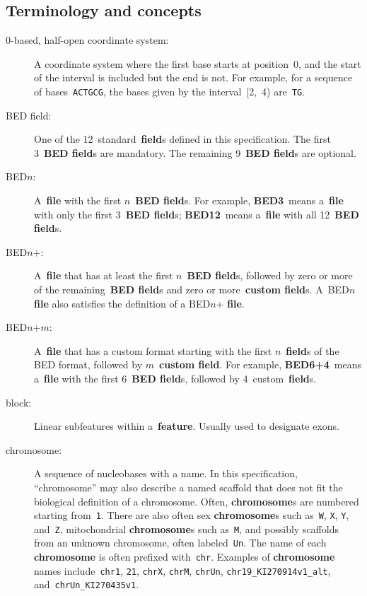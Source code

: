 \documentclass[11pt]{article}
\begin{document}
\subsection{Terminology and concepts}\label{sec:terms}
\begin{description}
\item[0-based, half-open coordinate system:]
  A coordinate system where the first base starts at position~0, and the start of the interval is included but the end is not.
  For example, for a sequence of bases~\texttt{ACTGCG}, the bases given by the interval~[2,~4) are~\texttt{TG}. %

\item[\acs{BED} field:]
  One of the 12~standard~\textbf{field}s defined in this specification.
  The first 3~\textbf{\acs{BED} field}s are mandatory.
  The remaining 9~\textbf{\acs{BED} field}s are optional.

\item[\acs{BED}$n$:]
  A~\textbf{file} with the first $n$~\textbf{\acs{BED} field}s.
  For example, \textbf{BED3}~means a~\textbf{file} with only the first 3~\textbf{\acs{BED} field}s; \textbf{BED12}~means a~\textbf{file} with all 12~\textbf{\acs{BED} field}s.

\item[\acs{BED}$n$+:]
  A~\textbf{file} that has at least the first $n$~\textbf{\acs{BED} field}s, followed by zero or more of the remaining~\textbf{\acs{BED} field}s and zero or more~\textbf{custom field}s.
  A~\acs{BED}$n$ \textbf{file} also satisfies the definition of a \acs{BED}$n$+ \textbf{file}.

\item[\acs{BED}$n$+$m$:]
  A~\textbf{file} that has a custom format starting with the first $n$~\textbf{field}s of the \ac{BED} format, followed by $m$~\textbf{custom field}.
  For example, \textbf{BED6+4}~means a~\textbf{file} with the first 6~\textbf{\acs{BED} field}s, followed by 4~custom~\textbf{field}s.

\item[block:]
  Linear subfeatures within a~\textbf{feature}.
  Usually used to designate exons.

\item[chromosome:]
  A sequence of nucleobases with a name.
  In this specification, ``chromosome'' may also describe a named scaffold that does not fit the biological definition of a chromosome.
  Often, \textbf{chromosome}s are numbered starting from~\texttt{1}.
  There are also often sex \textbf{chromosome}s such as~\texttt{W}, \texttt{X}, \texttt{Y}, and~\texttt{Z}, mitochondrial \textbf{chromosome}s such as~\texttt{M}, and possibly scaffolds from an unknown chromosome, often labeled~\texttt{Un}.
  The name of each \textbf{chromosome} is often prefixed with~\texttt{chr}.
  Examples of \textbf{chromosome} names include~\texttt{chr1}, \texttt{21}, \texttt{chrX}, \texttt{chrM}, \texttt{chrUn}, \texttt{chr19\_KI270914v1\_alt}, and~\texttt{chrUn\_KI270435v1}.


\end{description}
\end{document}
